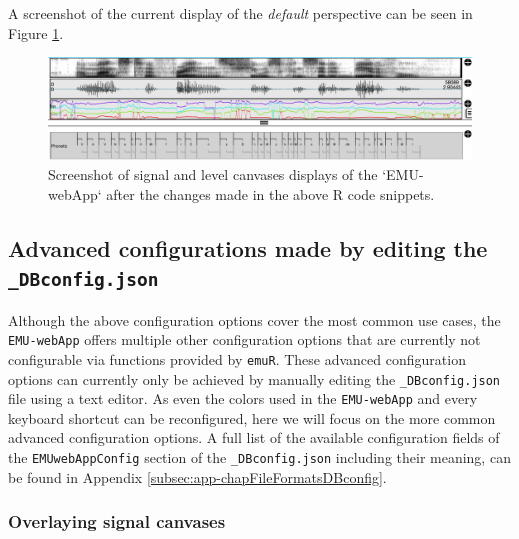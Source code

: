 \documentclass[]{book}
\theoremstyle{definition}
\theoremstyle{definition}
\theoremstyle{definition}
\theoremstyle{remark}
\begin{document}
A screenshot of the current display of the \emph{default} perspective
can be seen in Figure \ref{fig:webApp-postOderChange}.

\begin{figure}

{\centering \includegraphics[width=1\linewidth]{pics/emu-webAppPostOderChange} 

}

\caption{Screenshot of signal and level canvases displays of the `EMU-webApp` after the changes made in the above R code snippets.}\label{fig:webApp-postOderChange}
\end{figure}

\hypertarget{subsec:emu-webAppAdvancedConfig}{%
\subsection{\texorpdfstring{Advanced configurations made by editing the
\texttt{\_DBconfig.json}}{Advanced configurations made by editing the \_DBconfig.json}}\label{subsec:emu-webAppAdvancedConfig}}

Although the above configuration options cover the most common use
cases, the \texttt{EMU-webApp} offers multiple other configuration
options that are currently not configurable via functions provided by
\texttt{emuR}. These advanced configuration options can currently only
be achieved by manually editing the \texttt{\_DBconfig.json} file using
a text editor. As even the colors used in the \texttt{EMU-webApp} and
every keyboard shortcut can be reconfigured, here we will focus on the
more common advanced configuration options. A full list of the available
configuration fields of the \texttt{EMUwebAppConfig} section of the
\texttt{\_DBconfig.json} including their meaning, can be found in
Appendix \ref{subsec:app-chapFileFormatsDBconfig}.

\hypertarget{overlaying-signal-canvases}{%
\subsubsection{Overlaying signal
canvases}\label{overlaying-signal-canvases}}
\end{document}
